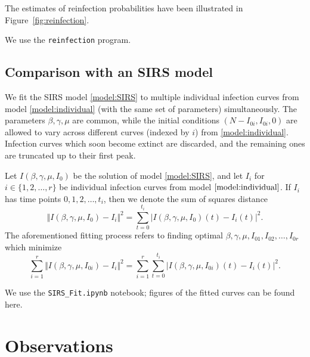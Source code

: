 \documentclass[11pt]{article}
\numberwithin{equation}{subsection}
\begin{document}
    The estimates of reinfection probabilities have been illustrated in
    Figure~\ref{fig:reinfection}.

    We use the \texttt{reinfection} program.


    \subsection{Comparison with an SIRS model}

    We fit the SIRS model \ref{model:SIRS} to multiple individual infection
    curves from model \ref{model:individual} (with the same set of parameters)
    simultaneously. The parameters $\beta, \gamma, \mu$ are common, while the
    initial conditions $(N - I_{0i}, I_{0i}, 0)$ are allowed to vary across
    different curves (indexed by $i$) from \ref{model:individual}.  Infection
    curves which soon become extinct are discarded, and the remaining ones are
    truncated up to their first peak.

    Let $I(\beta, \gamma, \mu, I_0)$ be the solution of model
    \ref{model:SIRS}, and let $I_i$ for $i \in \{1, 2, \dots, r\}$ be
    individual infection curves from model $\ref{model:individual}$. If $I_i$
    has time points $0, 1, 2, \dots, t_i$, then we denote the sum of squares
    distance \[
        \Vert I(\beta, \gamma, \mu, I_0) - I_i \Vert^2 =
        \sum_{t = 0}^{t_i} |I(\beta, \gamma, \mu, I_0)(t) - I_i(t)|^2.
    \] The aforementioned fitting process refers to finding optimal $\beta,
    \gamma, \mu, I_{01}, I_{02}, \dots, I_{0r}$ which minimize \[
        \sum_{i = 1}^r \Vert I(\beta, \gamma, \mu, I_{0i}) - I_i \Vert^2 =
        \sum_{i = 1}^r \sum_{t = 0}^{t_i} |I(\beta, \gamma, \mu, I_{0i})(t) -
        I_i(t)|^2.
    \]

    We use the \texttt{SIRS\_Fit.ipynb} notebook; figures of the fitted curves
    can be found here.


    \section{Observations}
\end{document}
